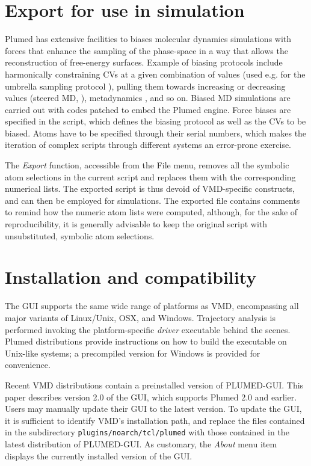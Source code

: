 \documentclass[preprint,12pt]{elsarticle}
\begin{document}
\section{Export for use in simulation}\label{sec:export-use-simul}

Plumed has extensive facilities to biases molecular dynamics
simulations with forces that enhance the sampling of the phase-space
in a way that allows the reconstruction of free-energy
surfaces. Example of biasing protocols include harmonically
constraining CVs at a given combination of values (used e.g. for the
umbrella sampling protocol \cite{Torrie_Valleau_1977}), pulling them
towards increasing or decreasing values (steered MD,
\cite{Isralewitz_Gao_Schulten_2001,Giorgino_2011}), metadynamics
\cite{Laio_Parrinello_2002}, and so on. Biased MD simulations are
carried out with codes patched to embed the Plumed engine. Force
biases are specified in the script, which defines the biasing protocol
as well as the CVs to be biased.  Atoms have to be specified
through their serial numbers, which makes the iteration of complex
scripts through different systems an error-prone exercise.

The \emph{Export} function, accessible from the File menu, removes all
the symbolic atom selections in the current script and replaces them
with the corresponding numerical lists. The exported script is thus
devoid of VMD-specific constructs, and can then be employed for
simulations.  The exported file contains comments to remind how the
numeric atom lists were computed, although, for the sake of
reproducibility, it is generally advisable to keep the original
script with unsubstituted, symbolic atom selections.



\section{Installation and compatibility}

The GUI supports the same wide range of platforms as VMD, encompassing
all major variants of Linux/Unix, OSX, and Windows.  Trajectory
analysis is performed invoking the platform-specific \emph{driver}
executable behind the scenes. Plumed distributions provide
instructions on how to build the executable on Unix-like systems; a
precompiled version for Windows is provided for convenience.

Recent VMD distributions contain a preinstalled version of PLUMED-GUI.
This paper describes version 2.0 of the GUI, which supports Plumed 2.0
and earlier.  Users may manually update their GUI to the latest
version.  To update the GUI, it is sufficient to identify VMD's
installation path, and replace the files contained in the subdirectory
\texttt{plugins/noarch/tcl/plumed} with those contained in the latest
distribution of PLUMED-GUI.  As customary, the \emph{About} menu item
displays the currently installed version of the GUI.
\end{document}
